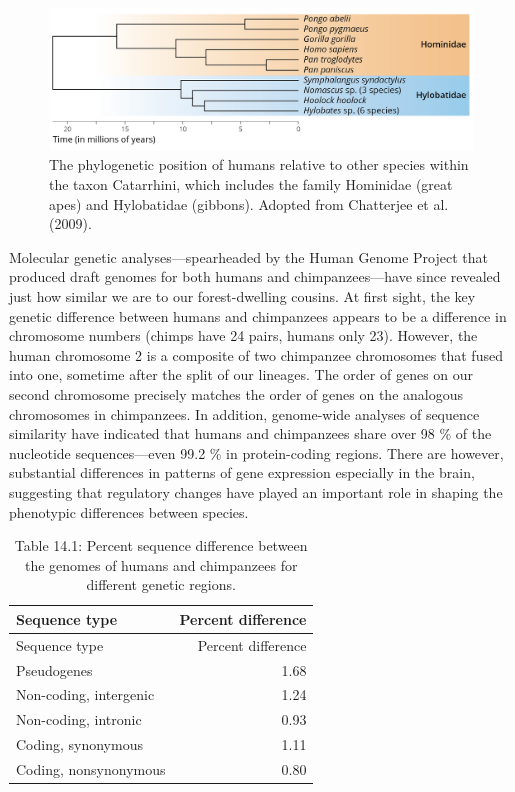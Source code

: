 \documentclass[
]{book}
\begin{document}
\begin{figure}
\includegraphics[width=1\linewidth]{images/primate_phylogeny} \caption{The phylogenetic position of humans relative to other species within the taxon Catarrhini, which includes the family Hominidae (great apes) and Hylobatidae (gibbons). Adopted from Chatterjee et al. (2009).}\label{fig:apes}
\end{figure}

Molecular genetic analyses---spearheaded by the Human Genome Project that produced draft genomes for both humans and chimpanzees---have since revealed just how similar we are to our forest-dwelling cousins. At first sight, the key genetic difference between humans and chimpanzees appears to be a difference in chromosome numbers (chimps have 24 pairs, humans only 23). However, the human chromosome 2 is a composite of two chimpanzee chromosomes that fused into one, sometime after the split of our lineages. The order of genes on our second chromosome precisely matches the order of genes on the analogous chromosomes in chimpanzees. In addition, genome-wide analyses of sequence similarity have indicated that humans and chimpanzees share over 98 \% of the nucleotide sequences---even 99.2 \% in protein-coding regions. There are however, substantial differences in patterns of gene expression especially in the brain, suggesting that regulatory changes have played an important role in shaping the phenotypic differences between species.

\begin{longtable}[]{@{}lr@{}}
\caption{Table 14.1: Percent sequence difference between the genomes of humans and chimpanzees for different genetic regions.}\tabularnewline
\toprule
Sequence type & Percent difference \\
\midrule
\endfirsthead
\toprule
Sequence type & Percent difference \\
\midrule
\endhead
Pseudogenes & 1.68 \\
Non-coding, intergenic & 1.24 \\
Non-coding, intronic & 0.93 \\
Coding, synonymous & 1.11 \\
Coding, nonsynonymous & 0.80 \\
\bottomrule
\end{longtable}
\end{document}
